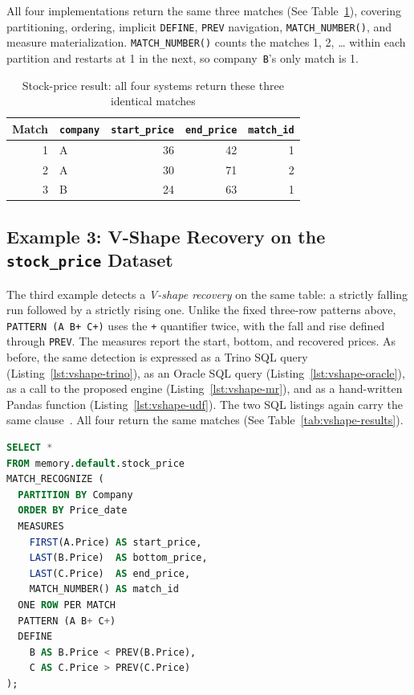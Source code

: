 All four implementations return the same three matches
(See Table~\ref{tab:stock-results}), covering partitioning, ordering,
implicit \texttt{DEFINE}, \texttt{PREV} navigation,
\texttt{MATCH\_NUMBER()}, and measure materialization.
\texttt{MATCH\_NUMBER()} counts the matches 1, 2, \ldots{} within each
partition and restarts at 1 in the next, so company~\texttt{B}'s only
match is 1.

\begin{table}[H]
\centering
\caption[Stock-price result]{Stock-price result: all four systems return these three identical
  matches}
\label{tab:stock-results}
{\small
\begin{tabular}{rlrrr}
\toprule
\textbf{Match} & \texttt{company} & \texttt{start\_price} & \texttt{end\_price} & \texttt{match\_id} \\
\midrule
1 & A & 36 & 42 & 1 \\
2 & A & 30 & 71 & 2 \\
3 & B & 24 & 63 & 1 \\
\bottomrule
\end{tabular}
}
\par{}
\end{table}

\subsection{Example 3: V-Shape Recovery on the \texttt{stock\_price} Dataset}
\label{subsec:eval-vshape}

The third example detects a \emph{V-shape recovery} on the same
table: a strictly falling run followed by a strictly rising one.
Unlike the fixed three-row patterns above, \texttt{PATTERN (A B+ C+)}
uses the \texttt{+} quantifier twice, with the fall and rise defined
through \texttt{PREV}.  The measures report the start, bottom, and
recovered prices.  As before, the same detection
is expressed as a Trino SQL query (Listing~\ref{lst:vshape-trino}), as
an Oracle SQL query (Listing~\ref{lst:vshape-oracle}), as a call to the
proposed engine (Listing~\ref{lst:vshape-mr}), and as a hand-written
Pandas function (Listing~\ref{lst:vshape-udf}).  The two SQL listings
again carry the same clause~\cite{monierashraf2025oracle}.  All four return the same
matches
(See Table~\ref{tab:vshape-results}).

\begin{lstlisting}[float=htbp,language=SQL,
  caption={[Trino SQL for the V-shape pattern]Trino SQL: detect the V-shape recovery on the \texttt{stock\_price} table (already created and loaded in Listing~\ref{lst:stock-trino}).},
  label={lst:vshape-trino}]
SELECT *
FROM memory.default.stock_price
MATCH_RECOGNIZE (
  PARTITION BY Company
  ORDER BY Price_date
  MEASURES
    FIRST(A.Price) AS start_price,
    LAST(B.Price)  AS bottom_price,
    LAST(C.Price)  AS end_price,
    MATCH_NUMBER() AS match_id
  ONE ROW PER MATCH
  PATTERN (A B+ C+)
  DEFINE
    B AS B.Price < PREV(B.Price),
    C AS C.Price > PREV(C.Price)
);
\end{lstlisting}

